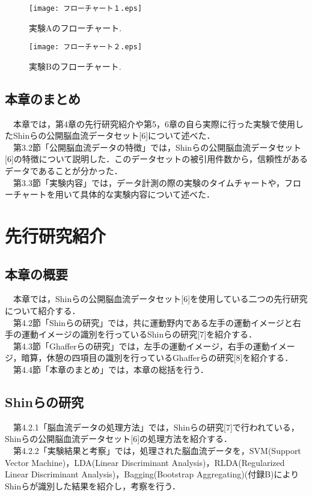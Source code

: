 \documentclass[a4j,12pt]{jreport}
\begin{document}
\begin{figure}[t]
  \begin{center}
    \texttt{[image: フローチャート１.eps]}
    \caption{実験Aのフローチャート.}
    \label{fig}
  \end{center}
\end{figure}

\begin{figure}[t]
  \begin{center}
    \texttt{[image: フローチャート２.eps]}
    \caption{実験Bのフローチャート.}
    \label{fig}
  \end{center}
\end{figure}

\section{本章のまとめ}
　本章では，第4章の先行研究紹介や第5，6章の自ら実際に行った実験で使用したShinらの公開脳血流データセット[6]について述べた．\\
　第3.2節「公開脳血流データの特徴」では，Shinらの公開脳血流データセット[6]の特徴について説明した．このデータセットの被引用件数から，信頼性があるデータであることが分かった．\\
　第3.3節「実験内容」では，データ計測の際の実験のタイムチャートや，フローチャートを用いて具体的な実験内容について述べた．\\

\chapter{先行研究紹介}
\section{本章の概要}
　本章では，Shinらの公開脳血流データセット[6]を使用している二つの先行研究について紹介する．\\
　第4.2節「Shinらの研究」では，共に運動野内である左手の運動イメージと右手の運動イメージの識別を行っているShinらの研究[7]を紹介する．\\
　第4.3節「Ghafferらの研究」では，左手の運動イメージ，右手の運動イメージ，暗算，休憩の四項目の識別を行っているGhafferらの研究[8]を紹介する．\\
　第4.4節「本章のまとめ」では，本章の総括を行う．\\

\section{Shinらの研究}
　第4.2.1「脳血流データの処理方法」では，Shinらの研究[7]で行われている，Shinらの公開脳血流データセット[6]の処理方法を紹介する．\\
　第4.2.2「実験結果と考察」では，処理された脳血流データを，SVM(Support Vector Machine)，LDA(Linear Discriminant Analysis)，RLDA(Regularized Linear Discriminant Analysis)，Bagging(Bootstrap Aggregating)(付録B)によりShinらが識別した結果を紹介し，考察を行う．\\
\end{document}

